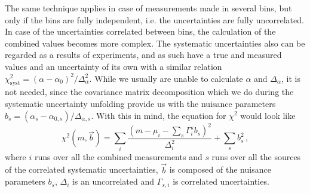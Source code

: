 The same technique applies in case of measurements made in several bins, but only if the bins are fully independent, i.e. the uncertainties are fully uncorrelated. In case of the uncertainties correlated between bins, the calculation of the combined values becomes more complex. The systematic uncertainties also can be regarded as a results of experiments, and as such have a true and measured values and an uncertainty of its own with a similar relation $\chi^2_\mathrm{syst}=(\alpha - \alpha_0)^2/\Delta^2_\alpha$. While we usually are unable to calculate $\alpha$ and $\Delta_\alpha$, it is not needed, since the covariance matrix decomposition which we do during the systematic uncertainty unfolding provide us with the nuisance parameters $b_s = (\alpha_s - \alpha_{0,s})/\Delta_{\alpha,s}$. With this in mind, the equation for $\chi^2$ would look like
\begin{equation}
\chi^2(m,\vec{b}) = \sum\limits_i \frac{\left(m-\mu_i - \sum\limits_s \Gamma^s_i b_s\right)^2}{\Delta^2_i}+\sum\limits_s b^2_s \,,
\end{equation}
where $i$ runs over all the combined measurements and $s$ runs over all the sources of the correlated systematic uncertainties, $\vec{b}$ is composed of the nuisance parameters $b_s$, $\Delta_i$ is an uncorrelated and $\Gamma_{s,i}$ is correlated uncertainties.

